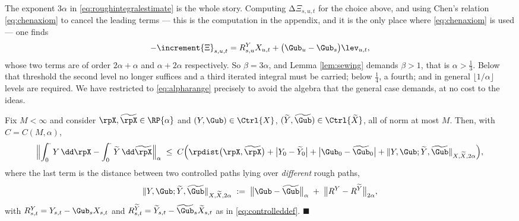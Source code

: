 \begin{remark}\label{rem:whyonethird}
The exponent $3\alpha$ in \eqref{eq:roughintegralestimate} is the whole story. Computing
$\increment{\Xi}_{s,u,t}$ for the choice above, and using Chen's relation \eqref{eq:chenaxiom} to
cancel the leading terms --- this is the computation in the appendix, and it is the only place
where \eqref{eq:chenaxiom} is used --- one finds
\begin{equation}\label{eq:xidefect}
-\increment{\Xi}_{s,u,t} = R^{Y}_{s,u}X_{u,t} + \bigl(\Gub_u - \Gub_s\bigr)\lev_{u,t},
\end{equation}
whose two terms are of order $2\alpha + \alpha$ and $\alpha + 2\alpha$ respectively. So
$\beta = 3\alpha$, and Lemma \ref{lem:sewing} demands $\beta > 1$, that is $\alpha > \tfrac13$.
Below that threshold the second level no longer suffices and a third iterated integral must be
carried; below $\tfrac14$, a fourth; and in general $\lfloor 1/\alpha\rfloor$ levels are required.
We have restricted to \eqref{eq:alpharange} precisely to avoid the algebra that the general case
demands, at no cost to the ideas.
\end{remark}

\begin{theorem}\label{thm:integralstability}
Fix $M<\infty$ and consider $\rpX,\widetilde\rpX \in \RP{\alpha}$ and $(Y,\Gub)\in\Ctrl{X}$,
$(\widetilde Y,\widetilde\Gub)\in\Ctrl{\widetilde X}$, all of norm at most $M$. Then, with
$C = C(M,\alpha)$,
\begin{equation}\label{eq:integralstability}
\Bigl\lVert \int_0^{\cdot} Y\,\dd\rpX - \int_0^{\cdot} \widetilde Y\,\dd\widetilde\rpX \Bigr\rVert_{\alpha}
\;\leq\; C\Bigl( \rpdist\bigl(\rpX,\widetilde\rpX\bigr) + \bigl|Y_0 - \widetilde Y_0\bigr| + \bigl|\Gub_0 - \widetilde\Gub_0\bigr| + \lVert Y,\Gub;\widetilde Y,\widetilde \Gub\rVert_{X,\widetilde X,2\alpha} \Bigr),
\end{equation}
where the last term is the distance between two controlled paths lying over \emph{different}
rough paths,
\begin{equation}\label{eq:controlleddistance}
\lVert Y,\Gub;\widetilde Y,\widetilde\Gub\rVert_{X,\widetilde X,2\alpha}
\;:=\; \bigl\lVert \Gub - \widetilde\Gub \bigr\rVert_{\alpha} \;+\; \bigl\lVert R^{Y} - R^{\widetilde Y}\bigr\rVert_{2\alpha},
\end{equation}
with $R^Y_{s,t} = Y_{s,t} - \Gub_sX_{s,t}$ and
$R^{\widetilde Y}_{s,t} = \widetilde Y_{s,t} - \widetilde\Gub_s\widetilde X_{s,t}$ as in
\eqref{eq:controlleddef}. \hfill $\blacksquare$
\end{theorem}


